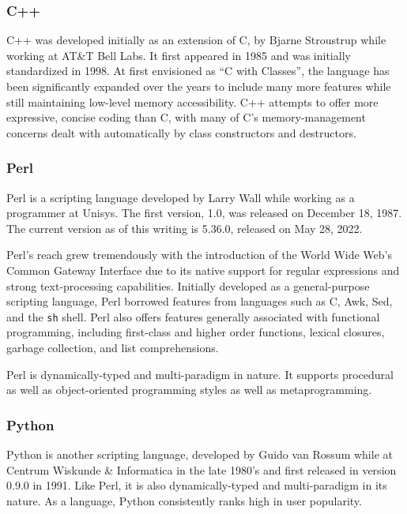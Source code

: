 \subsubsection{C++}

C++ was developed initially as an extension of C, by Bjarne Stroustrup while working at AT\&T Bell Labs. It first appeared in 1985 and was initially standardized in 1998. At first envisioned as ``C with Classes'', the language has been significantly expanded over the years to include many more features while still maintaining low-level memory accessibility. C++ attempts to offer more expressive, concise coding than C, with many of C's memory-management concerns dealt with automatically by class constructors and destructors.

\subsubsection{Perl}

Perl is a scripting language developed by Larry Wall while working as a programmer at Unisys. The first version, 1.0, was released on December 18, 1987. The current version as of this writing is 5.36.0, released on May 28, 2022.

Perl's reach grew tremendously with the introduction of the World Wide Web's Common Gateway Interface due to its native support for regular expressions and strong text-processing capabilities. Initially developed as a general-purpose scripting language, Perl borrowed features from languages such as C, Awk, Sed, and the \texttt{sh} shell. Perl also offers features generally associated with functional programming, including first-class and higher order functions, lexical closures, garbage collection, and list comprehensions.

Perl is dynamically-typed and multi-paradigm in nature. It supports procedural as well as object-oriented programming styles as well as metaprogramming.

\subsubsection{Python}

Python is another scripting language, developed by Guido van Rossum while at Centrum Wiskunde \& Informatica in the late 1980's and first released in version 0.9.0 in 1991. Like Perl, it is also dynamically-typed and multi-paradigm in its nature. As a language, Python consistently ranks high in user popularity.

